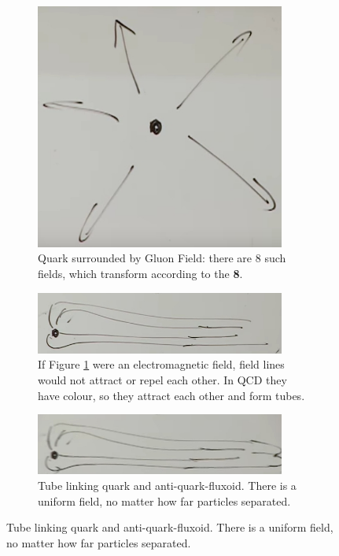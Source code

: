 \documentclass[]{article}
\begin{document}
\begin{figure}[H]
	\caption{Why QCD is more complicated than QED}\label{fig:QCD:QED}
	\begin{subfigure}[t]{0.45\textwidth}
		\caption[Quark surrounded by Gluon Field]{Quark surrounded by Gluon Field: there are 8 such fields, which transform according to the {\bfseries 8}.}\label{fig:2-4-quark-gluon-field}
		\includegraphics[width=0.9\textwidth]{2-4-quark-gluon-field}
	\end{subfigure}
	\begin{subfigure}[t]{0.45\textwidth}
		\caption{If Figure \ref{fig:2-4-quark-gluon-field} were an electromagnetic field, field lines would not attract or repel each other. In QCD they have colour, so they attract each other and form tubes.}
		\includegraphics[width=0.9\textwidth]{2-4-quark-gluon-field-tubes}
	\end{subfigure}
	\begin{subfigure}[t]{0.45\textwidth}
		\caption{Tube linking quark and anti-quark-fluxoid. There is a uniform field, no matter how far particles separated.}
		\includegraphics[width=0.9\textwidth]{2-4-quark-gluon-field-tubes-QAQ}

\end{subfigure}
\end{figure}
\end{document}
